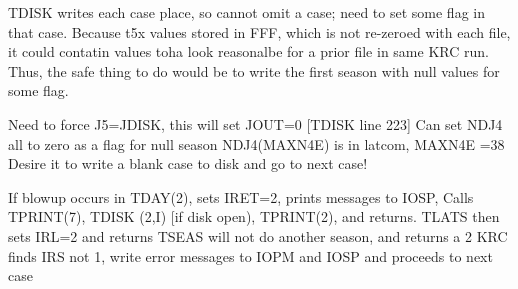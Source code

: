 \documentclass{article}
\begin{document}
TDISK writes each case place, so cannot omit a case; need to set some flag in
that case.  Because t5x values stored in FFF, which is not re-zeroed with each
file, it could contatin values toha look reasonalbe for a prior file in same KRC
run. Thus, the safe thing to do would be to write the first season with null
values for some flag.

Need to force J5=JDISK, this will set JOUT=0 [TDISK line 223] 
Can set NDJ4 all to zero as a flag for null season 
 NDJ4(MAXN4E) is in latcom, MAXN4E =38
Desire it to write a blank case to disk and go to next case!

If blowup occurs in TDAY(2), sets IRET=2, prints messages to IOSP, Calls TPRINT(7), TDISK (2,I) [if disk open), TPRINT(2), and returns.
\qi TLATS then sets IRL=2 and returns 
\qi TSEAS will not do another season, and returns a 2
\qi KRC finds IRS not 1, write error messages to IOPM and IOSP and proceeds to next case
\end{document}
